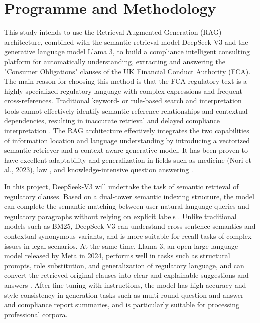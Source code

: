 \documentclass[a4paper,11pt]{article}
\begin{document}
\section{Programme and Methodology}

This study intends to use the Retrieval-Augmented Generation (RAG) architecture, combined with the semantic retrieval model DeepSeek-V3 and the generative language model Llama 3, to build a compliance intelligent consulting platform for automatically understanding, extracting and answering the "Consumer Obligations" clauses of the UK Financial Conduct Authority (FCA). The main reason for choosing this method is that the FCA regulatory text is a highly specialized regulatory language with complex expressions and frequent cross-references. Traditional keyword- or rule-based search and interpretation tools cannot effectively identify semantic reference relationships and contextual dependencies, resulting in inaccurate retrieval and delayed compliance interpretation \cite{lewis2020rag}. The RAG architecture effectively integrates the two capabilities of information location and language understanding by introducing a vectorized semantic retriever and a context-aware generative model. It has been proven to have excellent adaptability and generalization in fields such as medicine (Nori et al., 2023), law \cite{chalkidis2020legalbert}, and knowledge-intensive question answering \cite{karpukhin2020dense}.

In this project, DeepSeek-V3 will undertake the task of semantic retrieval of regulatory clauses. Based on a dual-tower semantic indexing structure, the model can complete the semantic matching between user natural language queries and regulatory paragraphs without relying on explicit labels \cite{deepseek2023}. Unlike traditional models such as BM25, DeepSeek-V3 can understand cross-sentence semantics and contextual synonymous variants, and is more suitable for recall tasks of complex issues in legal scenarios. At the same time, Llama 3, an open large language model released by Meta in 2024, performs well in tasks such as structural prompts, role substitution, and generalization of regulatory language, and can convert the retrieved original clauses into clear and explainable suggestions and answers \cite{meta2024llama3}. After fine-tuning with instructions, the model has high accuracy and style consistency in generation tasks such as multi-round question and answer and compliance report summaries, and is particularly suitable for processing professional corpora.
\end{document}
